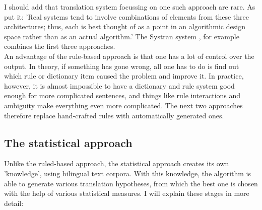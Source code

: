 \documentclass[12pt]{article}
\begin{document}
I should add that translation system focussing on one such approach are rare. As \citet{jm09} put it: 'Real systems tend to involve combinations of elements from these three architectures; thus, each is best thought of as a point in an algorithmic design space rather than as an actual algorithm.' The Systran system \citep{hs92,senellartea01}, for example combines the first three approaches.\\\indent
An advantage of the rule-based approach is that one has a lot of control over the output. In theory, if something has gone wrong, all one has to do is find out which rule or dictionary item caused the problem and improve it. In practice, however, it is almost impossible to have a dictionary and rule system good enough for more complicated sentences, and things like rule interactions and ambiguity make everything even more complicated. The next two approaches therefore replace hand-crafted rules with automatically generated ones.

\subsection{The statistical approach}

Unlike the ruled-based approach, the statistical approach creates its own 'knowledge', using bilingual text corpora. With this knowledge, the algorithm is able to generate various translation hypotheses, from which the best one is chosen with the help of various statistical measures. I will explain these stages in more detail:
\end{document}
